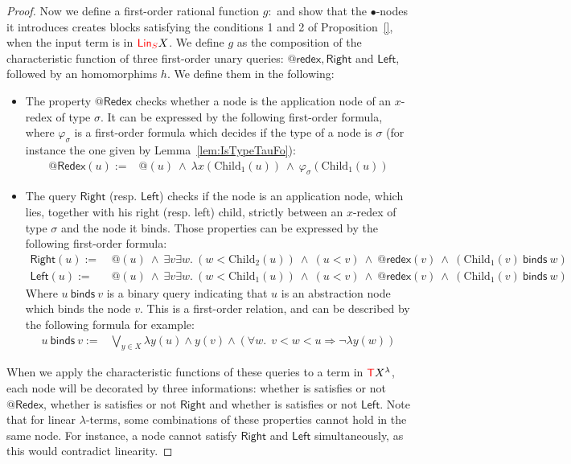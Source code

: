 \begin{proof}
Now we define a first-order rational function $g:$ and show that the $\bullet$-nodes it introduces creates blocks satisfying the conditions 1 and 2 of Proposition~\ref{}, when the input term is in ${\color{red}{\mathsf{Lin}_{S}}} X$.  
We define $g$ as the composition of the characteristic function of three first-order unary queries: $\mathsf{@redex}, \mathsf{Right}$ and $\mathsf{Left}$, followed by an homomorphims $h$. We define them in the following:
\begin{itemize}
\item The property $\mathsf{@Redex}$ checks whether a node is the application node of an $x$-redex of type $\sigma$. It can be expressed by the following first-order formula, where  $\varphi_\sigma$ is a first-order formula which decides if the type of a node is $\sigma$ (for instance the one given by Lemma~\ref{lem:IsTypeTauFo}):
\begin{align*} \mathsf{@Redex}( u ):=& \mathsf{@}(u)\ \wedge\ \lambda x(\mathrm{Child}_1(u))\ \wedge\ \varphi_\sigma(\mathrm{Child}_1(u))
\end{align*} 
\item The query $\mathsf{Right}$ (resp. $\mathsf{Left}$) checks if the node is an application node, which lies, together with his right (resp. left) child, strictly between an $x$-redex of type $\sigma$ and the node it binds. Those properties can be expressed by the following first-order formula:
\begin{align*}
\mathsf{Right}( u ):=&\ @(u)\ \wedge\ \exists v\exists w . \ (w< \mathrm{Child}_2(u))\ \wedge\ (u< v)\ \wedge \ \mathsf{@ redex}(v) \ \wedge\ (\mathrm{Child}_1(v)\ \mathsf{binds}\ w)\\
\mathsf{Left}( u ):=&\ @(u)\ \wedge\  \exists v\exists w . \ (w< \mathrm{Child}_1(u))\ \wedge\ (u< v)\ \wedge \ \mathsf{@ redex}(v) \ \wedge\ (\mathrm{Child}_1(v)\ \mathsf{binds}\ w)
\end{align*} 
Where $u\ \mathsf{binds} \ v$ is a binary query indicating that $u$ is an abstraction node which binds the node $v$. This is a first-order relation, and can be described by the following formula for example:
\begin{align*}
 u\ \mathsf{binds}\ v :=&\bigvee_{y\in X} \lambda y(u) \wedge y(v) \wedge (\forall w. \ \ v< w< u\Rightarrow \neg \lambda y(w))
 \end{align*}
\end{itemize}

When we apply the characteristic functions of these queries to a term in ${\color{red}{\mathsf T}} X^\lambda$, each node will be decorated by three informations: whether is satisfies or not $\mathsf{@Redex}$,  whether is satisfies or not $\mathsf{Right}$ and whether is satisfies or not $\mathsf{Left}$. Note that for linear $\lambda$-terms, some combinations of these properties cannot hold in the same node. For instance, a node cannot satisfy $\mathsf{Right}$ and $\mathsf{Left}$ simultaneously, as this would contradict linearity. 


\end{proof}
